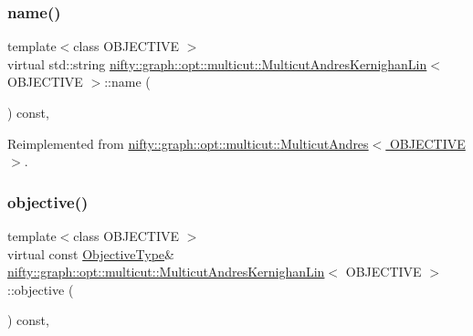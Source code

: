 \subsubsection{\texorpdfstring{name()}{name()}}
{\footnotesize\ttfamily template$<$class O\+B\+J\+E\+C\+T\+I\+VE $>$ \\
virtual std\+::string \hyperlink{classnifty_1_1graph_1_1opt_1_1multicut_1_1MulticutAndresKernighanLin}{nifty\+::graph\+::opt\+::multicut\+::\+Multicut\+Andres\+Kernighan\+Lin}$<$ O\+B\+J\+E\+C\+T\+I\+VE $>$\+::name (\begin{DoxyParamCaption}{ }\end{DoxyParamCaption}) const\hspace{0.3cm}{\ttfamily [inline]}, {\ttfamily [virtual]}}



Reimplemented from \hyperlink{classnifty_1_1graph_1_1opt_1_1multicut_1_1MulticutAndres_ac7a32dbee9103beb72ba2cf6fcd6ecee}{nifty\+::graph\+::opt\+::multicut\+::\+Multicut\+Andres$<$ O\+B\+J\+E\+C\+T\+I\+V\+E $>$}.

\mbox{\label{classnifty_1_1graph_1_1opt_1_1multicut_1_1MulticutAndresKernighanLin_aaf7fb543729a5be9211a8dd5400b404a}} 
\subsubsection{\texorpdfstring{objective()}{objective()}}
{\footnotesize\ttfamily template$<$class O\+B\+J\+E\+C\+T\+I\+VE $>$ \\
virtual const \hyperlink{classnifty_1_1graph_1_1opt_1_1multicut_1_1MulticutAndres_aed60c2f4ed9c6c6b97e8b513d7a48e86}{Objective\+Type}\& \hyperlink{classnifty_1_1graph_1_1opt_1_1multicut_1_1MulticutAndresKernighanLin}{nifty\+::graph\+::opt\+::multicut\+::\+Multicut\+Andres\+Kernighan\+Lin}$<$ O\+B\+J\+E\+C\+T\+I\+VE $>$\+::objective (\begin{DoxyParamCaption}{ }\end{DoxyParamCaption}) const\hspace{0.3cm}{\ttfamily [inline]}, {\ttfamily [virtual]}}



